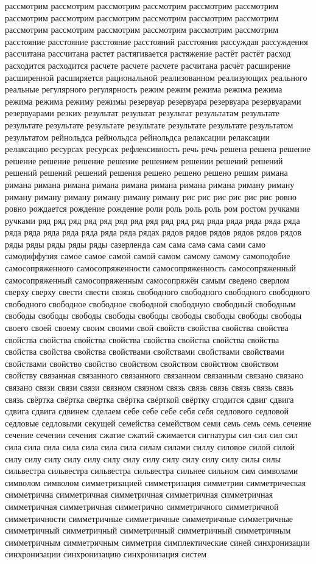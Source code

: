 рассмотрим рассмотрим рассмотрим рассмотрим рассмотрим рассмотрим рассмотрим рассмотрим рассмотрим рассмотрим рассмотрим рассмотрим рассмотрим рассмотрим рассмотрим рассмотрим рассмотрим рассмотрим расстояние расстояние расстояние расстояний расстояния рассуждая рассуждения рассчитана рассчитана растет растягивается растяжение растёт растёт расход расходится расходится расчете расчете расчете расчитана расчёт расширение расширенной расширяется рациональной реализованном реализующих реального реальные регулярного регулярность режим режим режима режима режима режима режима режиму режимы резервуар резервуара резервуара резервуарами резервуарами резких результат результат результат результатам результате результате результате результате результате результате результате результатом результатом рейнольдса рейнольдса рейнольдса релаксации релаксации релаксацию ресурсах ресурсах рефлексивность речь речь решена решена решение решение решение решение решение решением решении решений решений решений решений решений решения решено решено решено решим римана римана римана римана римана римана римана римана римана риману риману риману риману риману риману риману риману рис рис рис рис рис рис ровно ровно рождается рождение рождение роли роль роль роль ром ростом ручками ручками ряд ряд ряд ряд ряд ряд ряд ряд ряд ряд ряд ряда ряда ряда ряда ряда ряда ряда ряда ряда ряда ряда ряда рядах рядов рядов рядов рядов рядов рядов ряды ряды ряды ряды ряды сазерленда сам сама сама сама сами само самодиффузия самое самое самой самой самом самому самому самоподобие самосопряженного самосопряженности самосопряженность самосопряженный самосопряженный самосопряженным самосопряжён самым сведено сверлом сверху сверху свести свести свзязь свободного свободного свободного свободного свободного свободное свободное свободной свободную свободный свободным свободы свободы свободы свободы свободы свободы свободы свободы свободы своего своей своему своим своими свой свойств свойства свойства свойства свойства свойства свойства свойства свойства свойства свойства свойства свойства свойства свойства свойствами свойствами свойствами свойствами свойствами свойство свойство свойством свойством свойством свойством свойству связанная связанного связанного связанном связанным связано связано связано связи связи связи связном связном связь связь связь связь связь связь связь свёртка свёртка свёртка свёртка свёрткой свёртку сгодится сдвиг сдвига сдвига сдвига сдвинем сделаем себе себе себе себя себя седлового седловой седловые седловыми секущей семейства семейством семи семь семь семь сечение сечение сечении сечения сжатие сжатий сжимается сигнатуры сил сил сил сил сила сила сила сила сила сила сила силам силами силлу силовое силой силой силу силу силу силу силу силу силу силу силу силу силу силу силы силы сильвестра сильвестра сильвестра сильвестра сильнее сильном сим символами символом символом симметризацией симметризация симметрии симметрическая симметрична симметричная симметричная симметричная симметричная симметричная симметричная симметрично симметричного симметричной симметричности симметричные симметричные симметричные симметричные симметричный симметричный симметричный симметричный симметричным симметричным симметричным симметрия симплектические синей синхронизации синхронизации синхронизацию синхронизация систем 